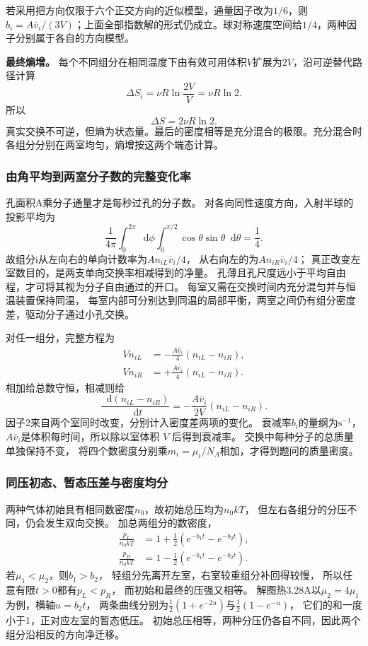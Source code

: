 \documentclass[UTF8,fontset=fandol,a4paper,11pt]{ctexart}
\newcommand{\dd}{\mathop{}\!\mathrm{d}}
\newcommand{\result}[1]{\begin{equation*}\boxed{#1}\end{equation*}}
\begin{document}
若采用把方向仅限于六个正交方向的近似模型，通量因子改为$1/6$，则$b_i=A\bar v_i/(3V)$；上面全部指数解的形式仍成立。球对称速度空间给$1/4$，两种因子分别属于各自的方向模型。

\textbf{最终熵增。} 每个不同组分在相同温度下由有效可用体积$V$扩展为$2V$，沿可逆替代路径计算
\[\Delta S_i=\nu R\ln\frac{2V}{V}=\nu R\ln2.\]
所以
\result{\Delta S=2\nu R\ln2.}
真实交换不可逆，但熵为状态量。最后的密度相等是充分混合的极限。充分混合时各组分分别在两室均匀，熵增按这两个端态计算。
\subsubsection*{由角平均到两室分子数的完整变化率}
孔面积A乘分子通量才是每秒过孔的分子数。
对各向同性速度方向，入射半球的投影平均为
\[
\frac1{4\pi}\int_0^{2\pi}\dd\phi
\int_0^{\pi/2}\cos\theta\sin\theta\dd\theta=\frac14.
\]
故组分i从左向右的单向计数率为$An_{iL}\bar v_i/4$，
从右向左的为$An_{iR}\bar v_i/4$；
真正改变左室数目的，是两支单向交换率相减得到的净量。
孔薄且孔尺度远小于平均自由程，才可将其视为分子自由通过的开口。
每室又需在交换时间内充分混匀并与恒温装置保持同温，
每室内部可分别达到同温的局部平衡，两室之间仍有组分密度差，驱动分子通过小孔交换。

对任一组分，完整方程为
\[
\begin{aligned}
V\dot n_{iL}&=-\frac{A\bar v_i}{4}(n_{iL}-n_{iR}),\\
V\dot n_{iR}&=+\frac{A\bar v_i}{4}(n_{iL}-n_{iR}).
\end{aligned}
\]
相加给总数守恒，相减则给
\[
\frac{\dd(n_{iL}-n_{iR})}{\dd t}
=-\frac{A\bar v_i}{2V}(n_{iL}-n_{iR}).
\]
因子2来自两个室同时改变，分别计入密度差两项的变化。
衰减率$b_i$的量纲为$\mathrm{s^{-1}}$，
$A\bar v_i$是体积每时间，所以除以室体积 $V$ 后得到衰减率。
交换中每种分子的总质量单独保持不变，
将四个数密度分别乘$m_i=\mu_i/N_A$相加，才得到题问的质量密度。

\subsubsection*{同压初态、暂态压差与密度均分}
两种气体初始具有相同数密度$n_0$，故初始总压均为$n_0kT$，
但左右各组分的分压不同，仍会发生双向交换。
加总两组分的数密度，
\[
\begin{aligned}
\frac{p_L}{n_0kT}&=1+\frac12(e^{-b_1t}-e^{-b_2t}),\\
\frac{p_R}{n_0kT}&=1-\frac12(e^{-b_1t}-e^{-b_2t}).
\end{aligned}
\]
若$\mu_1<\mu_2$，则$b_1>b_2$，
轻组分先离开左室，右室较重组分补回得较慢，
所以任意有限$t>0$都有$p_L<p_R$，
而初始和最终的压强又相等。
解图热3.28A以$\mu_2=4\mu_1$为例，横轴$u=b_2t$，
两条曲线分别为$\tfrac12(1+e^{-2u})$与$\tfrac12(1-e^{-u})$，
它们的和一度小于1，正对应左室的暂态低压。
初始总压相等，两种分压仍各自不同，因此两个组分沿相反的方向净迁移。
\end{document}

